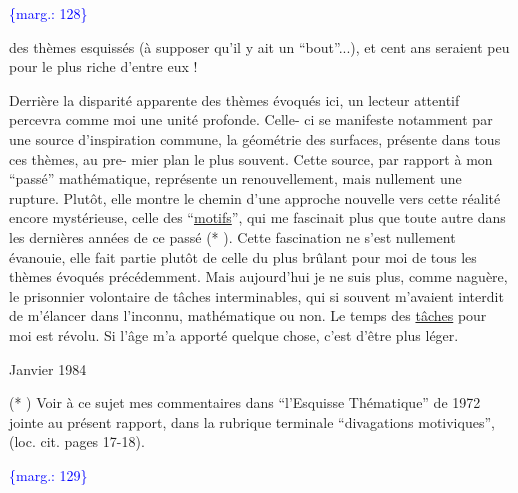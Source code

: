 \documentclass[11pt]{article}
\newcommand{\scanpage}[1]{\par\bigskip\noindent{\small\sffamily[scan #1]}\par}
\newcommand{\mspage}[1]{{\small\sffamily[p.\,#1]}}
\newcommand{\margin}[1]{\textcolor{blue}{\{\textsf{marg.:} #1\}}}
\newcommand{\uline}[1]{\underline{#1}}
\begin{document}
\margin{128}

\clearpage
\scanpage{119/129}
\mspage{51}

des thèmes esquissés (à supposer qu'il y ait un ``bout''...), et
cent ans seraient peu pour le plus riche d'entre eux !

Derrière la disparité apparente des thèmes évoqués ici,
un lecteur attentif percevra comme moi une unité profonde. Celle-%
ci se manifeste notamment par une source d'inspiration commune,
la géométrie des surfaces, présente dans tous ces thèmes, au pre-%
mier plan le plus souvent. Cette source, par rapport à mon ``passé''
mathématique, représente un renouvellement, mais nullement une
rupture. Plutôt, elle montre le chemin d'une approche nouvelle
vers cette réalité encore mystérieuse, celle des ``\uline{motifs}'', qui me
fascinait plus que toute autre dans les dernières années de ce
passé (* ). Cette fascination ne s'est nullement évanouie,
elle fait partie plutôt de celle du plus brûlant pour moi de tous
les thèmes évoqués précédemment. Mais aujourd'hui je ne suis plus,
comme naguère, le prisonnier volontaire de tâches interminables,
qui si souvent m'avaient interdit de m'élancer dans l'inconnu,
mathématique ou non. Le temps des \uline{tâches} pour moi est révolu. Si
l'âge m'a apporté quelque chose, c'est d'être plus léger.

Janvier 1984

(* ) Voir à ce sujet mes commentaires dans ``l'Esquisse Thématique''
de 1972 jointe au présent rapport, dans la rubrique terminale
``divagations motiviques'', (loc. cit. pages 17-18).

\margin{129}

\clearpage
\scanpage{119/130}
\mspage{52}
\end{document}
